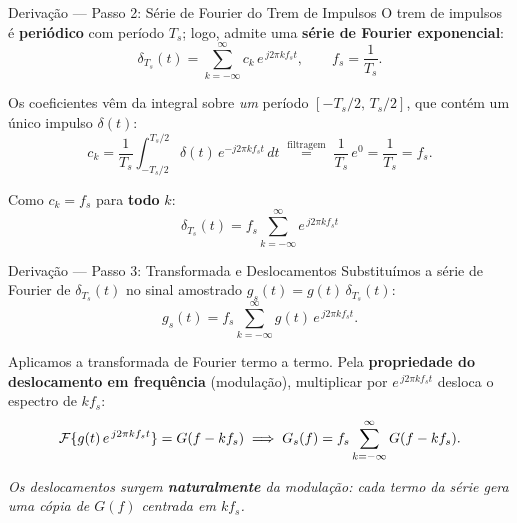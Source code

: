 
\begin{frame}{Derivação — Passo 2: Série de Fourier do Trem de Impulsos}
  O trem de impulsos é \textbf{periódico} com período $T_s$; logo, admite
  uma \textbf{série de Fourier exponencial}:
  \[
    \delta_{T_s}(t) = \sum_{k=-\infty}^{\infty} c_k\, e^{\,j 2\pi k f_s t},
    \qquad f_s = \frac{1}{T_s}.
  \]

  Os coeficientes vêm da integral sobre \emph{um} período
  $[-T_s/2,\, T_s/2]$, que contém um único impulso $\delta(t)$:
  \[
    c_k = \frac{1}{T_s}\!\int_{-T_s/2}^{T_s/2}\!
          \delta(t)\, e^{-j 2\pi k f_s t}\, dt
        \;\overset{\text{filtragem}}{=}\;
          \frac{1}{T_s}\, e^{0}
        = \frac{1}{T_s} = f_s.
  \]

  Como $c_k = f_s$ para \textbf{todo} $k$:
  \[
    \boxed{\;\delta_{T_s}(t) = f_s \sum_{k=-\infty}^{\infty}
           e^{\,j 2\pi k f_s t}\;}
  \]
\end{frame}


\begin{frame}{Derivação — Passo 3: Transformada e Deslocamentos}
  Substituímos a série de Fourier de $\delta_{T_s}(t)$ no sinal amostrado
  $g_s(t) = g(t)\,\delta_{T_s}(t)$:
  \[
    g_s(t) = f_s \sum_{k=-\infty}^{\infty} g(t)\, e^{\,j 2\pi k f_s t}.
  \]

  \vspace{0.2cm}
  Aplicamos a transformada de Fourier termo a termo. Pela
  \textbf{propriedade do deslocamento em frequência} (modulação),
  multiplicar por $e^{\,j 2\pi k f_s t}$ desloca o espectro de $k f_s$:
  \[
    \mathcal{F}\{g(t)\, e^{\,j 2\pi k f_s t}\} = G(f - k f_s)
    \;\Longrightarrow\;
    G_s(f) = f_s \sum_{k=-\infty}^{\infty} G(f - k f_s).
  \]

  \vspace{0.1cm}
  \textit{Os deslocamentos surgem \textbf{naturalmente} da modulação: cada
  termo da série gera uma cópia de $G(f)$ centrada em $k f_s$.}
\end{frame}


